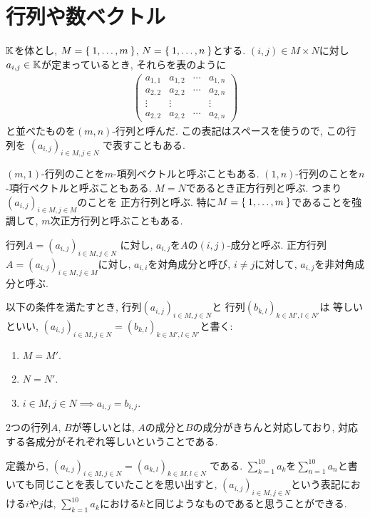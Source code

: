 \section{行列や数ベクトル}
$\mathbb{K}$を体とし,
$M=\Set{1,\ldots,m}$,
$N=\Set{1,\ldots,n}$とする.
$(i,j)\in M\times N$に対し$a_{i,j}\in \mathbb{K}$が定まっているとき,
それらを表のように
\begin{align*}
\begin{pmatrix}
a_{1,1} &a_{1,2} & \cdots & a_{1,n}\\
a_{2,2} &a_{2,2} & \cdots & a_{2,n}\\
\vdots &\vdots &   & \vdots\\
a_{2,2} &a_{2,2} & \cdots & a_{2,n}
\end{pmatrix}
\end{align*}
と並べたものを$(m,n)$-行列と呼んだ.
この表記はスペースを使うので,
この行列を
$(a_{i,j})_{i\in M, j\in N}$
で表すこともある.

$(m,1)$-行列のことを$m$-項列ベクトルと呼ぶこともある.
$(1,n)$-行列のことを$n$-項行ベクトルと呼ぶこともある.
$M=N$であるとき正方行列と呼ぶ.
つまり$(a_{i,j})_{i\in M, j\in M}$のことを
正方行列と呼ぶ.
特に$M=\Set{1,\ldots,m}$であることを強調して,
$m$次正方行列と呼ぶこともある.

行列$A=(a_{i,j})_{i\in M, j\in N}$
に対し,
$a_{i,j}$を$A$の$(i,j)$-成分と呼ぶ.
正方行列$A=(a_{i,j})_{i\in M, j\in M}$に対し,
$a_{i,i}$を対角成分と呼び,
$i\neq j$に対して, $a_{i,j}$を非対角成分と呼ぶ.


\begin{definition}
以下の条件を満たすとき,
行列$(a_{i,j})_{i\in M, j\in N}$と
行列$(b_{k,l})_{k\in M', l\in N'}$は
等しいといい,
$(a_{i,j})_{i\in M, j\in N}=(b_{k,l})_{k\in M', l\in N'}$と書く:
\begin{enumerate}
\item $M=M'$.
\item $N=N'$.
\item $i\in M,j\in N\implies a_{i,j}=b_{i,j}$.
\end{enumerate}
\end{definition}

2つの行列$A$, $B$が等しいとは,
$A$の成分と$B$の成分がきちんと対応しており,
対応する各成分がそれぞれ等しいということである.

\begin{remark}
定義から,
$(a_{i,j})_{i\in M, j\in N}=(a_{k,l})_{k\in M, l\in N}$
である.
$\sum_{k=1}^{10}a_k$を$\sum_{n=1}^{10}a_n$と書いても同じことを表していたことを思い出すと,
$(a_{i,j})_{i\in M, j\in N}$という表記における$i$や$j$は,
$\sum_{k=1}^{10}a_k$における$k$と同じようなものであると思うことができる.
\end{remark}

